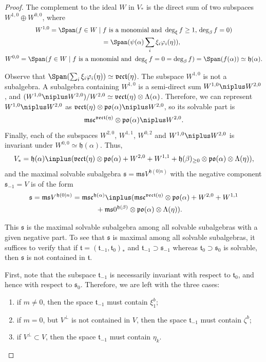 \documentclass[pdftex]{sigma}
\newcommand {\fc} {{\mathfrak{c}}}
\newcommand {\fh} {{\mathfrak{h}}}
\newcommand {\fm} {{\mathfrak{m}}}
\newcommand {\fpo} {{\mathfrak{po}}}
\newcommand {\fs} {{\mathfrak{s}}}
\newcommand {\ft} {{\mathfrak{t}}}
\newcommand {\fvect} {{\mathfrak{vect}}} %
\newcommand {\<} [2] {{\left.\vphantom{#2}\right.^{#1\!}\!{#2}}}
\numberwithin{equation}{section}
\begin{document}
\begin{proof}
The complement to the ideal $W$ in $V_*$ is the direct sum of two subspaces $W^{1,0}\oplus W^{0,0}$, where
\begin{gather*}
 W^{1,0}=\Span(f\in W\mid f   \ \text{is a monomial and}\ \deg_\xi f\ge 1,\, \deg_\beta f=0) \\
 \hphantom{W^{1,0}}{} =\Span(\psi(\alpha)\sum_i \xi_i\varphi_i(\eta)),\\
 W^{0,0}=\Span(f\in W\mid f \   \text{is a monomial and}  \ \deg_\xi f=0
= \deg_\beta f)
=\Span(f(\alpha))\simeq \fh(\alpha).
\end{gather*}

Observe that $\Span (\sum_i \xi_i\varphi_i(\eta))\simeq \fvect(\eta)$. The subspace $W^{1,0}$ is not a subalgebra. A subalgebra containing $W^{1,0}$ is a semi-direct sum $W^{1,0}\niplus W^{2,0}$, and
$(W^{1,0}\niplus W^{2,0})/W^{2,0} \simeq \fvect(\eta)\otimes \Lambda(\alpha)$. Therefore, we can represent $W^{1,0}\niplus W^{2,0}$ as $\fvect(\eta)\otimes \fpo(\alpha)\niplus W^{2,0}$, so its solvable part is
\[
\fm\fs\fc^{\fvect(\eta)}\otimes \fpo(\alpha)\niplus W^{2,0}.
\]
Finally, each of the subspaces $W^{2,0}$, $W^{1,1}$, $W^{0,2}$ and $W^{1,0}\niplus W^{2,0}$ is invariant under
$W^{0,0}\simeq\fh(\alpha)$.
Thus,
\[
V_*=\fh(\alpha)\inplus(\fvect(\eta)\otimes \fpo(\alpha)+W^{2,0}+W^{1,1}+\fh(\beta)_{\ge 0}\otimes \fpo(\alpha) \otimes \Lambda(\eta)),
\]
and the maximal solvable subalgebra $\fs=\fm\fs V^{\fh(0|n)}$ with the negative component $\fs_{-1}=V$ is of the form
\begin{gather}
\fs=\fm\fs V^{\fh(0|n)}=\fm\fs\fc^{\fh(\alpha)}\inplus (\fm\fs\fc^{\fvect(\eta)}\otimes \fpo(\alpha)+W^{2,0}+W^{1,1}\nonumber\\
\hphantom{\fs=}{}+\fm\fs 0^{\fh(\beta)}\otimes \fpo(\alpha) \otimes \Lambda(\eta)).\label{msV}
\end{gather}

This $\fs$ is the maximal solvable subalgebra among all solvable subalgebras with a given negative part. To see that $\fs$ is maximal among all solvable subalgebras, it suffices to verify that if $\ft=(\ft_{-1},\ft_0)_*$ and $\ft_{-1}\supset\fs_{-1}$ whereas $\ft_{0}\supset\fs_{0}$ is solvable, then $\fs$ is not contained in $\ft$.

First, note that the subspace $\ft_{-1}$ is necessarily invariant with respect to $\ft_0$, and hence with respect to $\fs_0$. Therefore, we are left with the three cases:
\begin{enumerate}\itemsep=0pt
\item[(i)] if $m\ne 0$, then the space $\ft_{-1}$ must contain $\xi^b_1$;
\item[(ii)] if $m=0$, but $V^\perp$ is not contained in $V$, then the space $\ft_{-1}$ must contain $\zeta^b$;
\item[(iii)] if $V^\perp\subset V$, then the space $\ft_{-1}$ must contain $\eta_k$.
\end{enumerate}


\end{proof}
\end{document}
